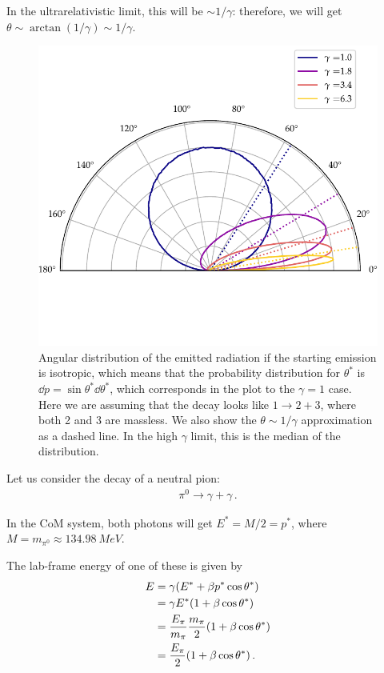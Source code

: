 \documentclass[main.tex]{subfiles}
\begin{document}
In the ultrarelativistic limit, this will be \(\sim 1/ \gamma \): therefore, we will get \(\theta \sim \arctan (1 / \gamma ) \sim 1/ \gamma \).

\begin{figure}[ht]
\centering
\includegraphics[width=\textwidth]{figures/angular_distribution_shift}
\caption{Angular distribution of the emitted radiation if the starting emission is isotropic, which means that the probability distribution for \(\theta^{*} \) is \(\dd{p} = \sin \theta^{*} \dd{\theta^{*} }\), which corresponds in the plot to the \(\gamma = 1\) case. Here we are assuming that the decay looks like \(1 \to 2 +3 \), where both 2 and 3 are massless.
We also show the \(\theta \sim 1/\gamma \) approximation as a dashed line. In the high \(\gamma \) limit, this is the median of the distribution.}
\label{fig:angular_distribution_shift}
\end{figure}

Let us consider the decay of a neutral pion: 
%
\begin{align}
\pi^{0} \to \gamma + \gamma 
\,.
\end{align}

In the CoM system, both photons will get \(E^{*} = M/2 = p^{*}\), where \(M = m_{\pi^{0}} \approx \SI{134.98}{MeV}\).

The lab-frame energy of one of these is given by 
%
\begin{align}
E &= \gamma \qty(E^{*} + \beta p^{*} \cos \theta^{*})\\
 &= \gamma E^{*} ( 1 + \beta \cos \theta^{*})  \\
 &= \frac{E_\pi }{m_\pi } \frac{m_\pi}{2} \qty(1 + \beta \cos \theta^{*})  \\
 &= \frac{E_\pi }{2} \qty(1 + \beta \cos \theta^{*})
\,.
\end{align}
\end{document}
